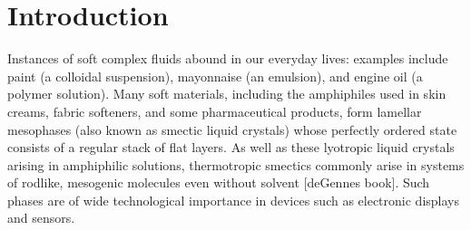 \documentclass[8.5pt,twoside,twocolumn]{article}
\begin{document}





\section{Introduction}

Instances of soft complex fluids abound in our everyday lives: examples include paint (a colloidal suspension), mayonnaise (an emulsion), and engine oil (a polymer solution). Many soft materials, including the amphiphiles used in skin creams, fabric softeners, and some pharmaceutical products, form lamellar mesophases (also known as smectic liquid crystals) whose perfectly ordered state consists of a regular stack of flat layers. As well as these lyotropic liquid crystals arising in amphiphilic solutions, thermotropic smectics commonly arise in systems of rodlike, mesogenic molecules even without solvent [deGennes book]. Such phases are of wide technological importance in devices
such as electronic displays and sensors.
\end{document}
